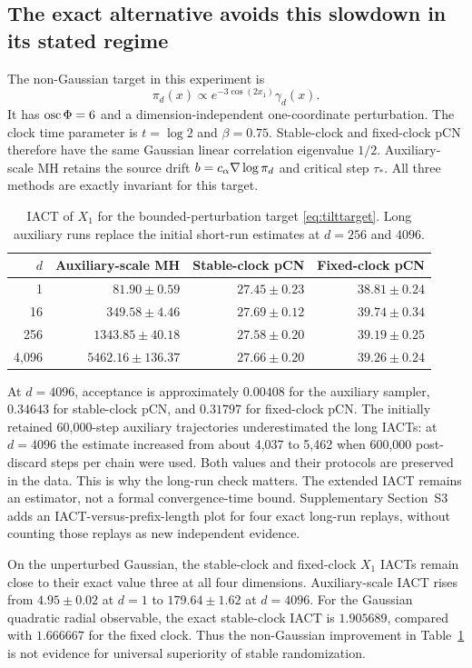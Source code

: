 \documentclass[pdflatex,iicol,sn-mathphys-ay]{sn-jnl}
\theoremstyle{definition}\newtheorem{definition}[theorem]{Definition}
\theoremstyle{remark}\newtheorem{remark}[theorem]{Remark}
\numberwithin{equation}{section}
\newcommand{\1}{\mathbf 1}
\begin{document}
\subsection{The exact alternative avoids this slowdown in its stated regime}
The non-Gaussian target in this experiment is
\begin{equation}
\pi_d(x)\propto e^{-3\cos(2x_1)}\gamma_d(x).\label{eq:tilttarget}
\end{equation}
It has $\operatorname{osc}\Phi=6$ and a dimension-independent one-coordinate perturbation. The clock time parameter is $t=\log2$ and $\beta=0.75$. Stable-clock and fixed-clock pCN therefore have the same Gaussian linear correlation eigenvalue $1/2$. Auxiliary-scale MH retains the source drift $b=c_\alpha\nabla\log\pi_d$ and critical step $\tau_*$. All three methods are exactly invariant for this target.

\begin{table}[t]\centering\small
\caption{IACT of $X_1$ for the bounded-perturbation target \eqref{eq:tilttarget}. Long auxiliary runs replace the initial short-run estimates at $d=256$ and $4096$.}
\begin{tabular}{@{}rrrr@{}}\toprule
$d$ & Auxiliary-scale MH & Stable-clock pCN & Fixed-clock pCN\\\midrule
1 &$81.90\pm0.59$&$27.45\pm0.23$&$38.81\pm0.24$\\
16 &$349.58\pm4.46$&$27.69\pm0.12$&$39.74\pm0.34$\\
256 &$1343.85\pm40.18$&$27.58\pm0.20$&$39.19\pm0.25$\\
4,096 &$5462.16\pm136.37$&$27.66\pm0.20$&$39.26\pm0.24$\\\bottomrule
\end{tabular}\label{tab:iact}
\end{table}
At $d=4096$, acceptance is approximately $0.00408$ for the auxiliary sampler, $0.34643$ for stable-clock pCN, and $0.31797$ for fixed-clock pCN. The initially retained 60,000-step auxiliary trajectories underestimated the long IACTs: at $d=4096$ the estimate increased from about 4,037 to 5,462 when 600,000 post-discard steps per chain were used. Both values and their protocols are preserved in the data. This is why the long-run check matters. The extended IACT remains an estimator, not a formal convergence-time bound. Supplementary Section~S3 adds an IACT-versus-prefix-length plot for four exact long-run replays, without counting those replays as new independent evidence.

On the unperturbed Gaussian, the stable-clock and fixed-clock $X_1$ IACTs remain close to their exact value three at all four dimensions. Auxiliary-scale IACT rises from $4.95\pm0.02$ at $d=1$ to $179.64\pm1.62$ at $d=4096$. For the Gaussian quadratic radial observable, the exact stable-clock IACT is $1.905689$, compared with $1.666667$ for the fixed clock. Thus the non-Gaussian improvement in Table~\ref{tab:iact} is not evidence for universal superiority of stable randomization.
\end{document}
